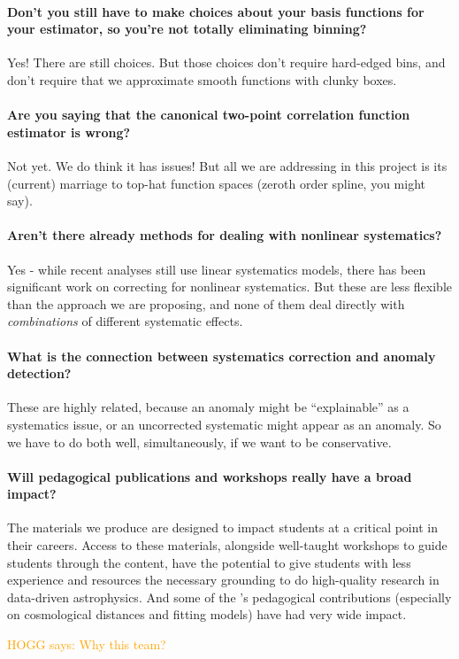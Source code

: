 \documentclass[12pt, fullpage, letterpaper]{article}
\newcommand{\HOGG}[1]{\textcolor{orange}{HOGG says: #1}}
\begin{document}
\paragraph{Don't you still have to make choices about your basis functions for your estimator, so you're not totally eliminating binning?}
Yes! There are still choices. But those choices don't require hard-edged bins, and don't require that we approximate smooth functions with clunky boxes.

\paragraph{Are you saying that the canonical two-point correlation function estimator is wrong?}
Not yet. We do think it has issues! But all we are addressing in this project is its (current) marriage to top-hat function spaces (zeroth order spline, you might say).

\paragraph{Aren't there already methods for dealing with nonlinear systematics?} Yes - while recent analyses still use linear systematics models, there has been significant work on correcting for nonlinear systematics. But these are less flexible than the approach we are proposing, and none of them deal directly with \emph{combinations} of different systematic effects.

\paragraph{What is the connection between systematics correction and anomaly detection?}
These are highly related, because an anomaly might be ``explainable'' as a systematics issue, or an uncorrected systematic might appear as an anomaly. So we have to do both well, simultaneously, if we want to be conservative.

\paragraph{Will pedagogical publications and workshops really have a broad impact?}
The materials we produce are designed to impact students at a critical point in their careers. Access to these materials, alongside well-taught workshops to guide students through the content, have the potential to give students with less experience and resources the necessary grounding to do high-quality research in data-driven astrophysics. And some of the \PI's pedagogical contributions (especially on cosmological distances and fitting models) have had very wide impact.

\HOGG{Why this team?}

\clearpage


\end{document}
